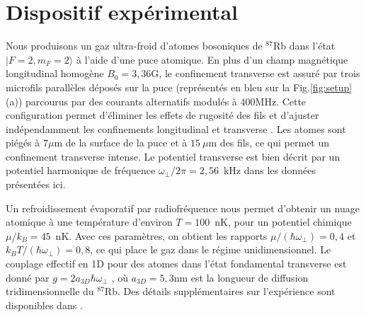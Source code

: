 \section{Dispositif expérimental}




Nous produisons un gaz ultra-froid d’atomes bosoniques de $^{87}$Rb dans l’état $|F=2,m_F=2\rangle$ à l’aide d’une puce atomique. En plus d’un champ magnétique longitudinal homogène $B_0 = 3{,}36$G, le confinement transverse est assuré par trois microfils parallèles déposés sur la puce (représentés en bleu sur la Fig.\ref{fig:setup}(a)) parcourus par des courants alternatifs modulés à $400$MHz. Cette configuration permet d’éliminer les effets de rugosité des fils et d’ajuster indépendamment les confinements longitudinal et transverse \cite{PhysRevLett.98.263201}. Les atomes sont piégés à $7\mu$m de la surface de la puce et à $15~\mu$m des fils, ce qui permet un confinement transverse intense. Le potentiel transverse est bien décrit par un potentiel harmonique de fréquence $\omega_{\perp}/2\pi = 2{,}56$~kHz dans les données présentées ici.


Un refroidissement évaporatif par radiofréquence nous permet d’obtenir un nuage atomique à une température d’environ $T = 100$~nK, pour un potentiel chimique $\mu / k_B = 45$~nK. Avec ces paramètres, on obtient les rapports $\mu / (\hbar \omega_{\perp}) = 0{,}4$ et $k_B T / (\hbar \omega_{\perp}) = 0{,}8$, ce qui place le gaz dans le régime unidimensionnel. Le couplage effectif en 1D pour des atomes dans l’état fondamental transverse est donné par $g = 2 a_{3D} \hbar \omega_{\perp}$ \cite{PhysRevLett.81.938}, où $a_{3D} = 5{,}3$nm est la longueur de diffusion tridimensionnelle du $^{87}$Rb\cite{PhysRevLett.89.283202}. Des détails supplémentaires sur l’expérience sont disponibles dans \cite{duboistel-04749900}.

